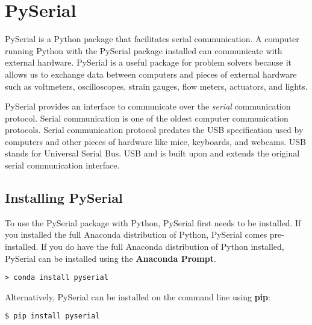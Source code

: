 \documentclass{book}
\begin{document}
    




    
        \hypertarget{pyserial}{%
\section{PySerial}\label{pyserial}}
    




    
        PySerial is a Python package that facilitates serial communication. A
computer running Python with the PySerial package installed can
communicate with external hardware. PySerial is a useful package for
problem solvers because it allows us to exchange data between computers
and pieces of external hardware such as voltmeters, oscilloscopes,
strain gauges, flow meters, actuators, and lights.

PySerial provides an interface to communicate over the \emph{serial}
communication protocol. Serial communication is one of the oldest
computer communication protocols. Serial communication protocol predates
the USB specification used by computers and other pieces of hardware
like mice, keyboards, and webcams. USB stands for Universal Serial Bus.
USB and is built upon and extends the original serial communication
interface.
    




    
        \hypertarget{installing-pyserial}{%
\subsection{Installing PySerial}\label{installing-pyserial}}
    




    
        To use the PySerial package with Python, PySerial first needs to be
installed. If you installed the full Anaconda distribution of Python,
PySerial comes pre-installed. If you do have the full Anaconda
distribution of Python installed, PySerial can be installed using the
\textbf{Anaconda Prompt}.

\begin{lstlisting}
> conda install pyserial
\end{lstlisting}

Alternatively, PySerial can be installed on the command line using
\textbf{pip}:

\begin{lstlisting}
$ pip install pyserial
\end{lstlisting}
\end{document}
